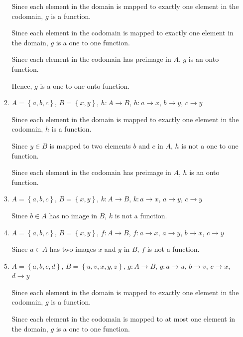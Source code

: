 \documentclass[12pt]{report}
\begin{document}
\begin{enumerate}
\begin{enumerate}
                Since each element in the domain is mapped to exactly one element in the
                codomain, $g$ is a function.

                Since each element in the codomain is mapped to exactly one element in the
                domain, $g$ is a one to one function.

                Since each element in the codomain has preimage in $A$, $g$ is an onto
                function.

                Hence, $g$ is a one to one onto function.

                \newpage

          \item $A = \left\{a, b, c\right\}$, $B = \left\{x, y\right\}$, $h: A \to
                  B$, $h: a \to x$, $b \to y$, $c \to y$
                \sol{}

                Since each element in the domain is mapped to exactly one element in the
                codomain, $h$ is a function.

                Since $y \in B$ is mapped to two elements $b$ and $c$ in $A$, $h$ is not a one
                to one function.

                Since each element in the codomain has preimage in $A$, $h$ is an onto
                function.

          \item $A = \left\{a, b, c\right\}$, $B = \left\{x, y\right\}$, $k: A \to
                  B$, $k: a \to x$, $a \to y$, $c \to y$
                \sol{}

                Since $b \in A$ has no image in $B$, $k$ is not a function.

          \item $A = \left\{a, b, c\right\}$, $B = \left\{x, y\right\}$, $f: A \to B$, $f: a \to x$, $a \to y$, $b \to x$, $c \to y$
                \sol{}

                Since $a \in A$ has two images $x$ and $y$ in $B$, $f$ is not a function.

          \item $A = \left\{a, b, c, d\right\}$, $B = \left\{u, v, x, y, z\right\}$, $g: A \to B$, $g: a \to u$, $b \to v$, $c \to x$, $d \to y$
                \sol{}

                Since each element in the domain is mapped to exactly one element in the
                codomain, $g$ is a function.

                Since each element in the codomain is mapped to at most one element in the
                domain, $g$ is a one to one function.


\end{enumerate}
\end{enumerate}
\end{document}
